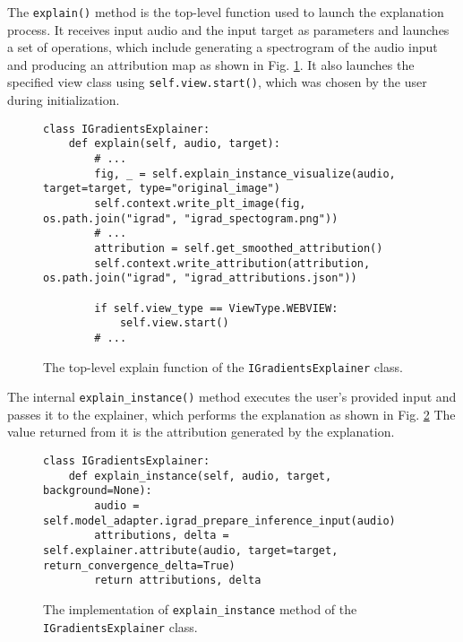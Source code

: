 \documentclass[
    bindingoffset=5mm,  %
    footnoteindent=3mm, %
    hyphenation=true    %
]{src/wut-thesis}
\begin{document}
The \texttt{explain()} method is the top-level function used to launch the explanation process.
It receives input audio and the input target as parameters and launches a set of operations,
which include generating a spectrogram of the audio input and producing an attribution map
as shown in Fig. \ref{fig:IgradMainExplainFunc}.
It also launches the specified view class using \texttt{self.view.start()},
which was chosen by the user during initialization.

\begin{figure}[h!]
\begin{verbatim}
class IGradientsExplainer:
    def explain(self, audio, target):
        # ...
        fig, _ = self.explain_instance_visualize(audio, target=target, type="original_image")
        self.context.write_plt_image(fig, os.path.join("igrad", "igrad_spectogram.png"))
        # ...
        attribution = self.get_smoothed_attribution()
        self.context.write_attribution(attribution, os.path.join("igrad", "igrad_attributions.json"))
       
        if self.view_type == ViewType.WEBVIEW:
            self.view.start()
        # ...
\end{verbatim}
\caption{The top-level explain function of the \texttt{IGradientsExplainer} class.}
\label{fig:IgradMainExplainFunc}
\end{figure}

The internal \texttt{explain_instance()} method executes the user’s provided input and passes
it to the explainer, which performs the explanation as shown in Fig. \ref{fig:ExplainInstance}
The value returned from it is the attribution generated by the explanation.

\begin{figure}[h!]
\begin{verbatim}
class IGradientsExplainer:
    def explain_instance(self, audio, target, background=None):
        audio = self.model_adapter.igrad_prepare_inference_input(audio)
        attributions, delta = self.explainer.attribute(audio, target=target, return_convergence_delta=True)
        return attributions, delta
\end{verbatim}
\caption{The implementation of \texttt{explain\_instance} method of the \texttt{IGradientsExplainer} class.}
\label{fig:ExplainInstance}
\end{figure}
\end{document}

